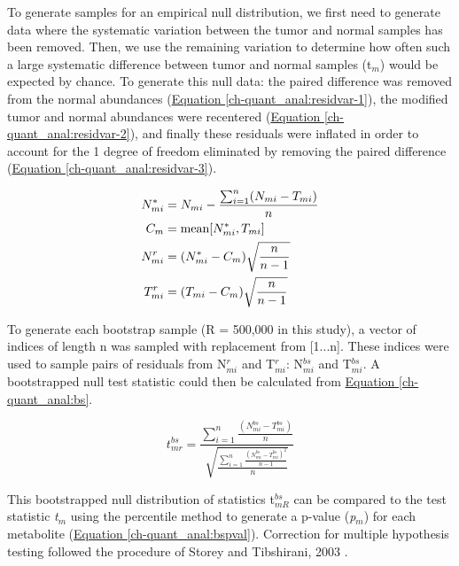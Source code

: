 To generate samples for an empirical null distribution, we first need to generate data where the systematic variation between the tumor and normal samples has been removed. Then, we use the remaining variation to determine how often such a large systematic difference between tumor and normal samples (t$_{m}$) would be expected by chance.  To generate this null data: the paired difference was removed from the normal abundances (\hyperref[ch-quant_anal:residvar-1]{Equation \ref{ch-quant_anal:residvar-1}}), the modified tumor and normal abundances were recentered (\hyperref[ch-quant_anal:residvar-2]{Equation \ref{ch-quant_anal:residvar-2}}), and finally these residuals were inflated in order to account for the 1 degree of freedom eliminated by removing the paired difference (\hyperref[ch-quant_anal:residvar-3]{Equation \ref{ch-quant_anal:residvar-3}}).

\begin{subequations}
\begin{align}
N^{*}_{mi} &= N_{mi} - \frac{\sum_{i = 1}^{n}(N_{mi} - T_{mi})}{n}\label{ch-quant_anal:residvar-1}\\
C_{m} &= \text{mean}[N^{*}_{mi}, T_{mi}]\label{ch-quant_anal:residvar-2}\\
N^{r}_{mi} &= (N^{*}_{mi} - C_{m})\sqrt{\frac{n}{n - 1}}\notag\\
T^{r}_{mi} &= (T_{mi} - C_{m})\sqrt{\frac{n}{n - 1}}\label{ch-quant_anal:residvar-3}
\end{align}
\end{subequations}


To generate each bootstrap sample (R = 500,000 in this study), a vector of indices of length n was sampled with replacement from [1...n]. These indices were used to sample pairs of residuals from N$^{r}_{mi}$ and T$^{r}_{mi}$: N$^{bs}_{mi}$ and T$^{bs}_{mi}$.  A bootstrapped null test statistic could then be calculated from \hyperref[ch-quant_anal:bs]{Equation \ref{ch-quant_anal:bs}}.

\begin{equation}
t^{bs}_{mr} = \frac{\sum_{i = 1}^{n}\frac{(N^{bs}_{mi} - T^{bs}_{mi})}{n}}{\sqrt{\frac{\sum_{i = 1}^{n}\frac{(N^{bs}_{mi} - T^{bs}_{mi})^{2}}{n-1}}{n}}}\label{ch-quant_anal:bs}
\end{equation}

This bootstrapped null distribution of statistics t$^{bs}_{mR}$ can be compared to the test statistic \textit{t}$_{m}$ using the percentile method to generate a p-value (\textit{p}$_{m}$) for each metabolite (\hyperref[ch-quant_anal:bspval]{Equation \ref{ch-quant_anal:bspval}}). Correction for multiple hypothesis testing followed the procedure of Storey and Tibshirani, 2003 \cite{Storey:2003cj}.

